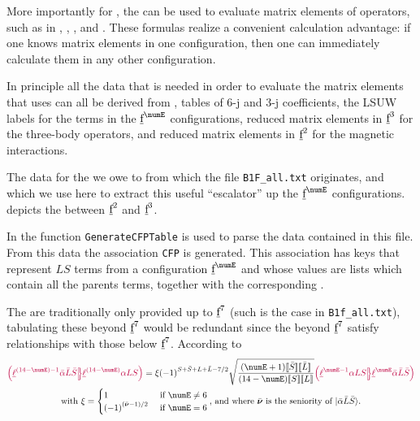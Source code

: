 \documentclass{article}
\newcommand{\codetext}[1]{{\color{BlueViolet} \texttt{#1}}}
\begin{document}
More importantly for \qlanth, the \cfps can be used to evaluate matrix elements of operators, such as in , , , and . These formulas realize a convenient calculation advantage: if one knows matrix elements in one configuration, then one can immediately calculate them in any other configuration.

In principle all the data that is needed in order to evaluate the matrix elements that \qlanth uses can all be derived from \cfps, tables of 6-j and 3-j coefficients, the LSUW labels for the terms in the $\forb^{\numE}$ configurations, reduced matrix elements in $\underbar{$\text{f}$}^3$ for the three-body operators, and reduced matrix elements in $\underbar{$\text{f}$}^2$ for the magnetic interactions. 

The data for the \cfps we owe to \cite{velkov_multi-electron_2000} from which the file \codetext{B1F\_all.txt} originates, and which we use here to extract this useful ``escalator'' up the $\forb^{\numE}$ configurations.  depicts the \cfps between $\underbar{$\text{f}$}^2$ and $\underbar{$\text{f}$}^3$.

In \qlanth the function \codetext{GenerateCFPTable} is used to parse the data contained in this file. From this data the association \codetext{CFP} is generated. This association has keys that represent $LS$ terms from a configuration $\forb^{\numE}$ and whose values are lists which contain all the parents terms, together with the corresponding \cfps.



The \cfps are traditionally only provided up to $\underbar{$\text{f}$}^7$ (such is the case in \codetext{B1f\_all.txt}), tabulating these beyond $\underbar{$\text{f}$}^7$ would be redundant since the \cfps beyond $\underbar{$\text{f}$}^7$ satisfy relationships with those below $\underbar{$\text{f}$}^7$. According to \cite{nielson_spectroscopic_1963}
\begin{multline}
\cfp{\lorb^{(14 - \numE)-1}\bar{\alpha}\bar{L}\bar{S}}
			{\lorb^{(14-\numE)}\alpha{LS}} =
			\xi
			\phaser{S+\bar{S}+L+\bar{L}-7/2}
			\sqrt{\frac{(\numE+1)\tpobraket{\bar{S}}\tpobraket{{\bar{L}}}}{(14-\numE)\tpobraket{S}\tpobraket{L}}}
			\cfp{\lorb^{\numE-1}\alpha{LS}}
			{\lorb^{\numE}\bar{\alpha}\bar{L}\bar{S}} \\
\text{with }\xi = \begin{cases}
1 & \text{ if }\numE \neq 6 \\
\phaser{(\bar{\senior} - 1)/2} & \text{ if }\numE = 6
\end{cases}	\text{, and where  $\bar{\senior}$ is the seniority of $\ket{\bar{\alpha} \bar{L}\bar{S} }$.}
\end{multline}
\end{document}
